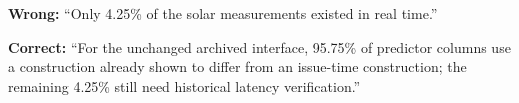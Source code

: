\documentclass[11pt]{article}
\begin{document}
\textbf{Wrong:} ``Only 4.25\% of the solar measurements existed in real time.''

\textbf{Correct:} ``For the unchanged archived interface, 95.75\% of predictor columns use a construction already shown to differ from an issue-time construction; the remaining 4.25\% still need historical latency verification.''
\end{document}
